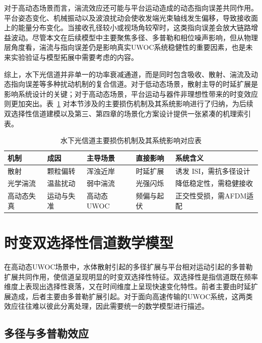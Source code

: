 对于高动态场景而言，湍流效应还可能与平台运动造成的动态指向误差共同作用。平台姿态变化、机械振动以及波浪扰动会使收发端光束轴线发生偏移，导致接收面上的能量分布变化。当接收孔径较小或视场角较窄时，这类指向误差会放大链路增益波动。尽管本文在后续模型中主要聚焦多径、多普勒和相位噪声影响，但从物理层角度看，湍流与指向误差仍是影响真实UWOC系统稳健性的重要因素，也是未来实验验证与模型拓展中需要考虑的内容。

综上，水下光信道并非单一的功率衰减通道，而是同时包含吸收、散射、湍流及动态指向误差等多种扰动机制的复合信道。对于低动态场景，散射主导的时延扩展是影响系统设计的关键；对于高动态场景，平台运动与器件非理想性带来的时变效应则更加突出。表~\ref{tab:uwoc_impairments} 对本节涉及的主要损伤机制及其系统影响进行了归纳，为后续双选择性信道建模以及第三、第四章的场景化方案设计提供一张紧凑的机理索引表。

\begin{table}[htbp]
    \centering
    \caption{水下光信道主要损伤机制及其系统影响对应表}
    \label{tab:uwoc_impairments}
    \footnotesize
    \setlength{\tabcolsep}{4pt}
    \begin{tabular}{l p{2.3cm}p{2.0cm}p{2.1cm}p{3.0cm}}
        \toprule
        机制 & 成因 & 主导场景 & 直接影响 & 系统含义 \\
        \midrule
        散射 & 颗粒偏转 & 浑浊近岸 & 时延扩展 & 诱发 ISI，需抗多径设计 \\
        光学湍流 & 温盐扰动 & 弱中湍流 & 光强闪烁 & 降低稳定性，需稳健接收 \\
        高动态失真 & 运动与失准 &\raggedright 高动态UWOC& 频偏与起伏 & 正交性受损，需AFDM适配 \\
        \bottomrule
    \end{tabular}
\end{table}

\section{时变双选择性信道数学模型}
\label{sec:doubly_selective_model}

在高动态UWOC场景中，水体散射引起的多径扩展与平台相对运动引起的多普勒扩展共同作用，使信道呈现明显的时变双选择性特征\cite{bemaniAFDMFullDiversity2021}。双选择性是指信道既在频率维度上表现出选择性衰落，又在时间维度上呈现快速变化特性。前者主要由时延扩展造成，后者主要由多普勒扩展引起。对于面向高速传输的UWOC系统，这两类效应往往难以彼此分离处理，因此需要统一的数学模型进行描述。

\subsection{多径与多普勒效应}

